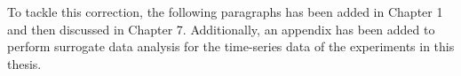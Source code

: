 \documentclass[12pt]{article}
\begin{document}









To tackle this correction, the following paragraphs has been added 
in Chapter 1 and then discussed in Chapter 7. Additionally,
an appendix has been added to perform surrogate data analysis
for the time-series data of the experiments in this thesis.
\end{document}
